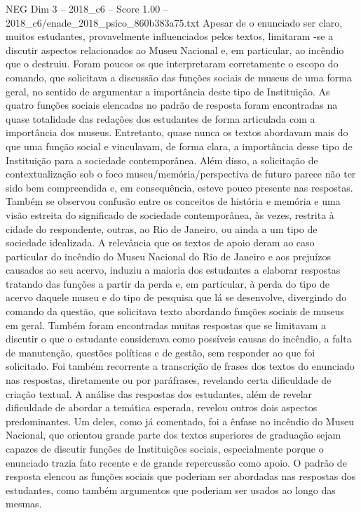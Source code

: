 \begin{textsample}{NEG Dim 3 – 2018\_c6 – Score 1.00 – 2018\_c6/enade\_2018\_psico\_860b383a75.txt}
Apesar de o enunciado ser claro, muitos estudantes, provavelmente influenciados pelos textos, limitaram -se a discutir aspectos relacionados ao Museu Nacional e, em particular, ao incêndio que o destruiu.
Foram poucos os que interpretaram corretamente o escopo do comando, que solicitava a discussão das funções sociais de museus de uma forma geral, no sentido de argumentar a importância deste tipo de Instituição.
As quatro funções sociais elencadas no padrão de resposta foram encontradas na quase totalidade das redações dos estudantes de forma articulada com a importância dos museus.
Entretanto, quase nunca os textos abordavam mais do que uma função social e vinculavam, de forma clara, a importância desse tipo de Instituição para a sociedade contemporânea.
Além disso, a solicitação de contextualização sob o foco museu/memória/perspectiva de futuro parece não ter sido bem compreendida e, em consequência, esteve pouco presente nas respostas.
Também se observou confusão entre os conceitos de história e memória e uma visão estreita do significado de sociedade contemporânea, às vezes, restrita à cidade do respondente, outras, ao Rio de Janeiro, ou ainda a um tipo de sociedade idealizada.
A relevância que os textos de apoio deram ao caso particular do incêndio do Museu Nacional do Rio de Janeiro e aos prejuízos causados ao seu acervo, induziu a maioria dos estudantes a elaborar respostas tratando das funções a partir da perda e, em particular, à perda do tipo de acervo daquele museu e do tipo de pesquisa que lá se desenvolve, divergindo do comando da questão, que solicitava texto abordando funções sociais de museus em geral.
Também foram encontradas muitas respostas que se limitavam a discutir o que o estudante considerava como possíveis causas do incêndio, a falta de manutenção, questões políticas e de gestão, sem responder ao que foi solicitado.
Foi também recorrente a transcrição de frases dos textos do enunciado nas respostas, diretamente ou por paráfrases, revelando certa dificuldade de criação textual.
A análise das respostas dos estudantes, além de revelar dificuldade de abordar a temática esperada, revelou outros dois aspectos predominantes.
Um deles, como já comentado, foi a ênfase no incêndio do Museu Nacional, que orientou grande parte dos textos superiores de graduação sejam capazes de discutir funções de Instituições sociais, especialmente porque o enunciado trazia fato recente e de grande repercussão como apoio.
O padrão de resposta elencou as funções sociais que poderiam ser abordadas nas respostas dos estudantes, como também argumentos que poderiam ser usados ao longo das mesmas.

\end{textsample}
